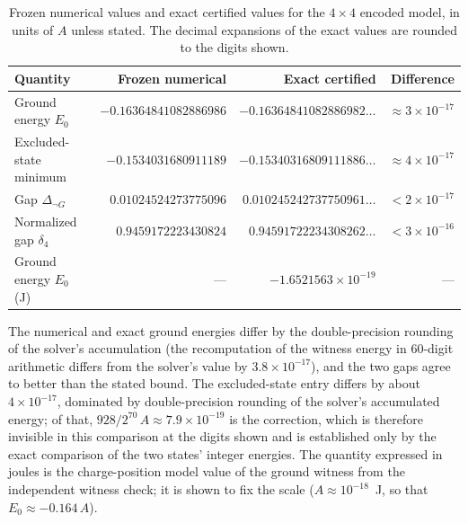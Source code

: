 \documentclass[11pt,a4paper]{article}
\theoremstyle{plain}
\theoremstyle{definition}
\theoremstyle{remark}
\newcommand{\dnG}{\Delta_{\neg G}}
\begin{document}
\begin{table}[t]
\centering\footnotesize
\caption{Frozen numerical values and exact certified values for the $4\times4$ encoded model, in units of $A$ unless stated. The decimal expansions of the exact values are rounded to the digits shown.}
\label{tab:numexact}
\begin{tabular}{@{}p{3.1cm}rrr@{}}
\toprule
Quantity & Frozen numerical & Exact certified & Difference\\
\midrule
Ground energy $E_0$ & $-0.16364841082886986$ & $-0.16364841082886982\ldots$ & $\approx3\times10^{-17}$\\
Excluded-state minimum & $-0.1534031680911189$ & $-0.15340316809111886\ldots$ & $\approx4\times10^{-17}$\\
Gap $\dnG$ & $0.01024524273775096$ & $0.010245242737750961\ldots$ & $<2\times10^{-17}$\\
Normalized gap $\delta_4$ & $0.9459172223430824$ & $0.94591722234308262\ldots$ & $<3\times10^{-16}$\\
\midrule
Ground energy $E_0$ (J) & --- & $-1.6521563\times10^{-19}$ & ---\\
\bottomrule
\end{tabular}
\end{table}

The numerical and exact ground energies differ by the double-precision rounding of the solver's accumulation (the recomputation of the witness energy in 60-digit arithmetic differs from the solver's value by $3.8\times10^{-17}$), and the two gaps agree to better than the stated bound. The excluded-state entry differs by about $4\times10^{-17}$, dominated by double-precision rounding of the solver's accumulated energy; of that, $928/2^{70}\,A\approx7.9\times10^{-19}$ is the correction, which is therefore invisible in this comparison at the digits shown and is established only by the exact comparison of the two states' integer energies. The quantity expressed in joules is the charge-position model value of the ground witness from the independent witness check; it is shown to fix the scale ($A\approx10^{-18}$~J, so that $E_0\approx-0.164\,A$).
\end{document}
